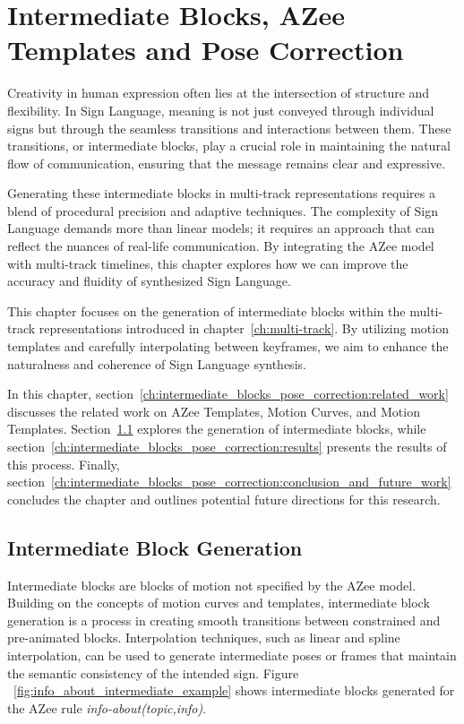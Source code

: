 \documentclass[../../main.tex]{subfiles}
\begin{document}
\chapter{Intermediate Blocks, AZee Templates and Pose Correction}
\label{ch:intermediate_blocks_pose_correction}

Creativity in human expression often lies at the intersection of structure and flexibility. In Sign Language, meaning is not just conveyed through individual signs but through the seamless transitions and interactions between them. These transitions, or intermediate blocks, play a crucial role in maintaining the natural flow of communication, ensuring that the message remains clear and expressive.

Generating these intermediate blocks in multi-track representations requires a blend of procedural precision and adaptive techniques. The complexity of Sign Language demands more than linear models; it requires an approach that can reflect the nuances of real-life communication. By integrating the AZee model with multi-track timelines, this chapter explores how we can improve the accuracy and fluidity of synthesized Sign Language.

This chapter focuses on the generation of intermediate blocks within the multi-track representations introduced in chapter~\ref{ch:multi-track}. By utilizing motion templates and carefully interpolating between keyframes, we aim to enhance the naturalness and coherence of Sign Language synthesis.

In this chapter, section~\ref{ch:intermediate_blocks_pose_correction:related_work} discusses the related work on AZee Templates, Motion Curves, and Motion Templates. Section~\ref{ch:intermediate_blocks_pose_correction:intermediate_block_generation} explores the generation of intermediate blocks, while section~\ref{ch:intermediate_blocks_pose_correction:results} presents the results of this process. Finally, section~\ref{ch:intermediate_blocks_pose_correction:conclusion_and_future_work} concludes the chapter and outlines potential future directions for this research.

\section{Intermediate Block Generation}
\label{ch:intermediate_blocks_pose_correction:intermediate_block_generation}

Intermediate blocks are blocks of motion not specified by the AZee model. Building on the concepts of motion curves and templates, intermediate block generation is a process in creating smooth transitions between constrained and pre-animated blocks. Interpolation techniques, such as linear and spline interpolation, can be used to generate intermediate poses or frames that maintain the semantic consistency of the intended sign. Figure ~\ref{fig:info_about_intermediate_example} shows intermediate blocks generated for the AZee rule \emph{info-about(topic,info)}.
\end{document}

